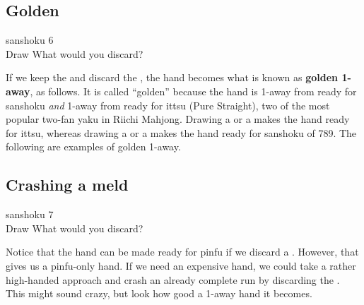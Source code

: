 \newpage
\subsection{Golden}\label{sec:san6}
\begin{itembox}[r]{{\jap sanshoku} 6}
\bp
{}~\\
\hspace{290pt}\footnotesize{Draw}
\ep
\vspace{-17pt}What would you discard? \vspace{-5pt}
\end{itembox}
\noindent
If we keep the {\large{}} and discard the {\large{}}, the hand becomes what is known as {\bf golden 1-away}, as follows.
\bp
{}
\ep {}
It is called ``golden'' because the hand is 1-away from ready for {\jap sanshoku} \emph{and} 1-away from ready for {\jap ittsu} (Pure Straight), two of the most popular two-{\jap fan yaku} in Riichi Mahjong. 
Drawing a {\large{}} or a {\large{}} makes the hand ready for {\jap ittsu}, whereas drawing a {\large{}} or a {\large{}} makes the hand ready for {\jap sanshoku} of 789. The following are examples of golden 1-away.
\bp
{}\fa\fa\\
\ep

\newpage
\subsection{Crashing a meld}\label{sec:san7}
\begin{itembox}[r]{{\jap sanshoku} 7}
\bp
{}~\\
\hspace{290pt}\footnotesize{Draw}
\ep
\vspace{-15pt}What would you discard? \vspace{-5pt}
\end{itembox}
\noindent
Notice that the hand can be made ready for {\jap pinfu} if we discard a {\large{}}. However, that gives us a {\jap pinfu}-only hand. If we need an expensive hand, we could take a rather high-handed approach and crash an already complete run by discarding the {\large{}}. This might sound crazy, but look how good a 1-away hand it becomes.

